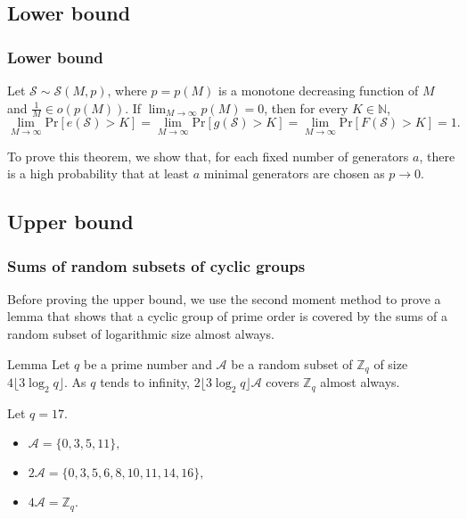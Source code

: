\documentclass{beamer}
\def\N{\ensuremath{\mathbb{N}}}
\def\ZZ{\ensuremath{\mathbb{Z}}}
\def\Pr{\ensuremath{\mathrm{Pr}}}
\begin{document}
\subsection{Lower bound}

\begin{frame}
\frametitle{Lower bound}
\begin{theorem}
    Let $\mathcal{S} \sim \mathcal{S}(M, p)$, where $p = p(M)$ is a monotone decreasing function of $M$ and $\frac{1}{M} \in o(p(M))$.
    If $\lim_{M \to \infty} p(M) = 0$, then for every $K \in \N$,   
    \[\lim_{M \to \infty} \Pr[e(\mathcal{S}) > K] = \lim_{M \to \infty} \Pr[g(\mathcal{S}) > K] = \lim_{M \to \infty} \Pr[F(\mathcal{S}) > K] = 1.\]
\end{theorem}
To prove this theorem, we show that, for each fixed number of generators $a$, there is a high probability that at least $a$ minimal generators are chosen as $p \to 0$.
\end{frame}



\subsection{Upper bound}

\begin{frame}
\frametitle{Sums of random subsets of cyclic groups}
Before proving the upper bound, we use the second moment method to prove a lemma that shows that a cyclic group of prime order is covered by the sums of a random subset of logarithmic size almost always. 
\begin{block}{Lemma}
    Let $q$ be a prime number and $\mathcal{A}$ be a random subset of $\mathbb{Z}_q$ of size $4\lfloor3\log_2 q\rfloor$. As $q$ tends to infinity, $2\lfloor3\log_2 q\rfloor \mathcal{A}$ covers $\mathbb{Z}_q$ almost always. 
\end{block}
\begin{example}
    Let \(q = 17\).
    \begin{itemize}
        \item\(\mathcal{A} = \{0, 3, 5, 11\},\)
        \item \(2\mathcal{A} = \{0, 3, 5, 6, 8, 10, 11, 14, 16\},\)
        \item \(4\mathcal{A} = \ZZ_q.\)
    \end{itemize}
\end{example}
\end{frame}
\end{document}
